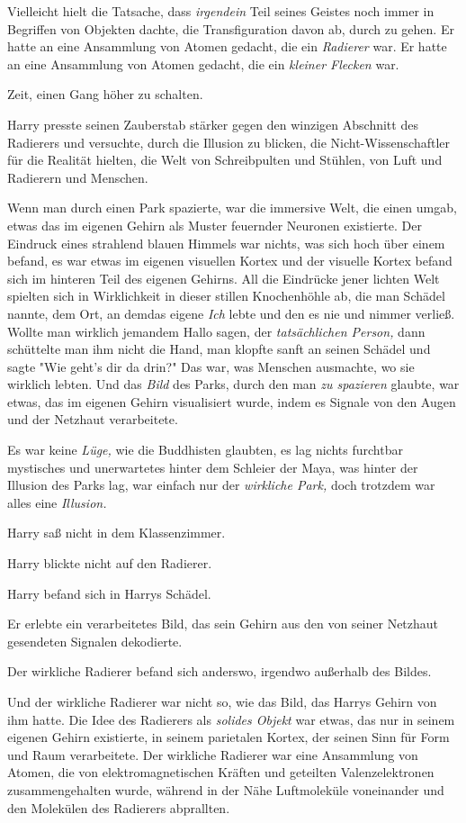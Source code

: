 {Vielleicht hielt die Tatsache, dass \emph{irgendein} Teil seines Geistes noch immer in Begriffen von Objekten dachte, die Transfiguration davon ab, durch zu gehen. Er hatte an eine Ansammlung von Atomen gedacht, die ein \emph{Radierer} war. Er hatte an eine Ansammlung von Atomen gedacht, die ein \emph{kleiner Flecken} war.

Zeit, einen Gang höher zu schalten.

Harry presste seinen Zauberstab stärker gegen den winzigen Abschnitt des Radierers und versuchte, durch die Illusion zu blicken, die Nicht-Wissenschaftler für die Realität hielten, die Welt von Schreibpulten und Stühlen, von Luft und Radierern und Menschen.

Wenn man durch einen Park spazierte, war die immersive Welt, die einen umgab, etwas das im eigenen Gehirn als Muster feuernder Neuronen existierte. Der Eindruck eines strahlend blauen Himmels war nichts, was sich hoch über einem befand, es war etwas im eigenen visuellen Kortex und der visuelle Kortex befand sich im hinteren Teil des eigenen Gehirns. All die Eindrücke jener lichten Welt spielten sich in Wirklichkeit in dieser stillen Knochenhöhle ab, die man Schädel nannte, dem Ort, an demdas eigene \emph{Ich} lebte und den es nie und nimmer verließ. Wollte man wirklich jemandem Hallo sagen, der \emph{tatsächlichen Person,} dann schüttelte man ihm nicht die Hand, man klopfte sanft an seinen Schädel und sagte "Wie geht's dir da drin?" Das war, was Menschen ausmachte, wo sie wirklich lebten. Und das \emph{Bild} des Parks, durch den man \emph{zu spazieren} glaubte, war etwas, das im eigenen Gehirn visualisiert wurde, indem es Signale von den Augen und der Netzhaut verarbeitete.

Es war keine \emph{Lüge,} wie die Buddhisten glaubten, es lag nichts furchtbar mystisches und unerwartetes hinter dem Schleier der Maya, was hinter der Illusion des Parks lag, war einfach nur der \emph{wirkliche Park,} doch trotzdem war alles eine \emph{Illusion.}

Harry saß nicht in dem Klassenzimmer.

Harry blickte nicht auf den Radierer.

Harry befand sich in Harrys Schädel.

Er erlebte ein verarbeitetes Bild, das sein Gehirn aus den von seiner Netzhaut gesendeten Signalen dekodierte.

Der wirkliche Radierer befand sich anderswo, irgendwo außerhalb des Bildes.

Und der wirkliche Radierer war nicht so, wie das Bild, das Harrys Gehirn von ihm hatte. Die Idee des Radierers als \emph{solides Objekt} war etwas, das nur in seinem eigenen Gehirn existierte, in seinem parietalen Kortex, der seinen Sinn für Form und Raum verarbeitete. Der wirkliche Radierer war eine Ansammlung von Atomen, die von elektromagnetischen Kräften und geteilten Valenzelektronen zusammengehalten wurde, während in der Nähe Luftmoleküle voneinander und den Molekülen des Radierers abprallten.

}
